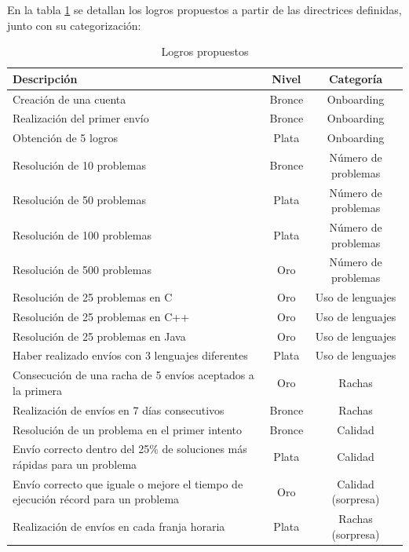 En la tabla \ref{tab:logros} se detallan los logros propuestos a partir de las directrices definidas, junto con su categorización:

\begin{table}[h]
\centering
\small
\begin{tabular}{p{8cm}cc}
\toprule
\textbf{Descripción} & \textbf{Nivel} & \textbf{Categoría} \\
\midrule
Creación de una cuenta & Bronce & Onboarding \\
\midrule
Realización del primer envío & Bronce & Onboarding \\
\midrule
Obtención de 5 logros & Plata & Onboarding \\
\midrule
Resolución de 10 problemas & Bronce & Número de problemas \\
\midrule
Resolución de 50 problemas & Plata & Número de problemas \\
\midrule
Resolución de 100 problemas & Plata & Número de problemas \\
\midrule
Resolución de 500 problemas & Oro & Número de problemas \\
\midrule
Resolución de 25 problemas en C & Oro & Uso de lenguajes \\
\midrule
Resolución de 25 problemas en C++ & Oro & Uso de lenguajes \\
\midrule
Resolución de 25 problemas en Java & Oro & Uso de lenguajes \\
\midrule
Haber realizado envíos con 3 lenguajes diferentes & Plata & Uso de lenguajes \\
\midrule
Consecución de una racha de 5 envíos aceptados a la primera & Oro & Rachas \\
\midrule
Realización de envíos en 7 días consecutivos & Bronce & Rachas \\
\midrule
Resolución de un problema en el primer intento & Bronce & Calidad \\
\midrule
Envío correcto dentro del 25\% de soluciones más rápidas para un problema & Plata & Calidad \\
\midrule
Envío correcto que iguale o mejore el tiempo de ejecución récord para un problema & Oro & Calidad (sorpresa) \\
\midrule
Realización de envíos en cada franja horaria & Plata & Rachas (sorpresa) \\
\bottomrule
\end{tabular}
\caption{Logros propuestos}
\label{tab:logros}
\end{table}

